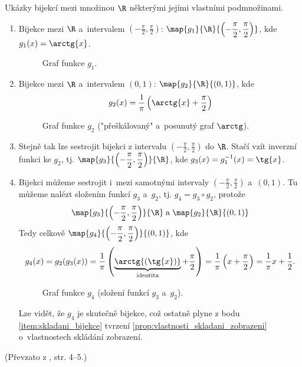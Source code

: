 \begin{example}\label{ex:bijekce_realna_cisla}
    Ukázky bijekcí mezi množinou $\R$ některými jejími vlastními podmnožinami.
    \begin{enumerate}[label=(\roman*)]
        \item\label{item:funkce_arctg} Bijekce mezi $\R$ a~intervalem $\displaystyle\left(-\frac{\pi}{2},\frac{\pi}{2}\right)$: $\displaystyle\map{g_1}{\R}{\left(-\frac{\pi}{2},\frac{\pi}{2}\right)}$, kde $g_1(x)=\arctg{x}$.
        \begin{figure}[H]
            \centering
            
            \caption{Graf funkce $g_1$.}
            \label{fig:graf_g1}
        \end{figure}
        \item\label{item:bijekce_0_a_1} Bijekce mezi $\R$ a~intervalem $(0,1)$: $\map{g_2}{\R}{(0,1)}$, kde
        \begin{equation*}
            g_2(x)=\frac{1}{\pi}\left(\arctg{x}+\frac{\pi}{2}\right)
        \end{equation*}
        \begin{figure}[H]
            \centering
            
            \caption{Graf funkce $g_2$ ("přeškálovaný" a~posunutý graf $\arctg$).}
            \label{fig:graf_g2}
        \end{figure}
        \item\label{item:funkce_tg} Stejně tak lze sestrojit bijekci z intervalu $\displaystyle\left(-\frac{\pi}{2},\frac{\pi}{2}\right)$ do $\R$. Stačí vzít inverzní funkci ke $g_2$, tj. $\displaystyle\map{g_3}{\left(-\frac{\pi}{2},\frac{\pi}{2}\right)}{\R}$, kde $g_3(x)=g_1^{-1}(x)=\tg{x}$.
        \item\label{item:bijekce_slozena} Bijekci můžeme sestrojit i~mezi samotnými intervaly $\displaystyle\left(-\frac{\pi}{2},\frac{\pi}{2}\right)$ a~$(0,1)$. Tu můžeme nalézt složením funkcí $g_3$ a~$g_2$, tj. $g_4=g_3\circ g_2$, protože
        \begin{equation*}
            \map{g_3}{\left(-\frac{\pi}{2},\frac{\pi}{2}\right)}{\R}\;\text{a}\;\map{g_2}{\R}{(0,1)}
        \end{equation*}
        Tedy celkově $\displaystyle\map{g_4}{\left(-\frac{\pi}{2},\frac{\pi}{2}\right)}{(0,1)}$, kde
        \begin{equation*}
            g_4(x)=g_2(g_3(x))=\frac{1}{\pi}\left(\underbrace{\arctg{(\tg{x})}}_{\text{identita}}+\frac{\pi}{2}\right)=\frac{1}{\pi}\left(x+\frac{\pi}{2}\right)=\frac{1}{\pi}x+\frac{1}{2}.
        \end{equation*}
        \begin{figure}[H]
            \centering
            
            \caption{Graf funkce $g_4$ (složení funkcí $g_3$ a~$g_2$).}
            \label{fig:graf_g4}
        \end{figure}
        Lze vidět, že $g_4$ je skutečně bijekce, což ostatně plyne z bodu \ref{item:skladani_bijekce} tvrzení \ref{prop:vlastnosti_skladani_zobrazeni} o~vlastnostech skládání zobrazení.
    \end{enumerate}
\end{example}
(Převzato z \cite{Rmoutil2022}, str. 4--5.)